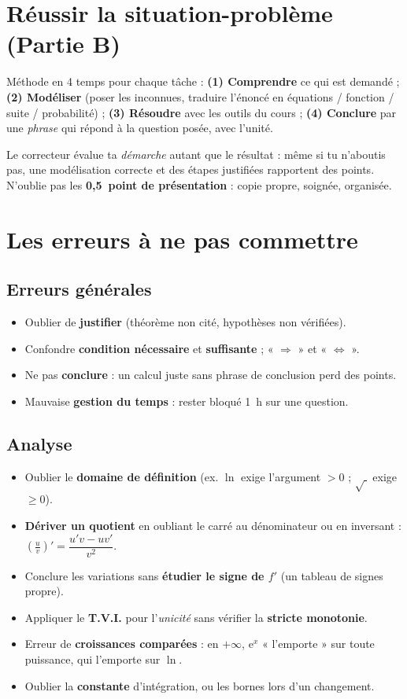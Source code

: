 \section{Réussir la situation-problème (Partie B)}

\begin{aretenir}
Méthode en 4 temps pour chaque tâche : \textbf{(1) Comprendre} ce qui est demandé ;
\textbf{(2) Modéliser} (poser les inconnues, traduire l'énoncé en équations / fonction /
suite / probabilité) ; \textbf{(3) Résoudre} avec les outils du cours ; \textbf{(4) Conclure}
par une \emph{phrase} qui répond à la question posée, avec l'unité.
\end{aretenir}

\noindent Le correcteur évalue ta \emph{démarche} autant que le résultat : même si tu
n'aboutis pas, une modélisation correcte et des étapes justifiées rapportent des points.
N'oublie pas les \textbf{0,5~point de présentation} : copie propre, soignée, organisée.

\section{Les erreurs à ne pas commettre}

\subsection{Erreurs générales}
\begin{itemize}
\item Oublier de \textbf{justifier} (théorème non cité, hypothèses non vérifiées).
\item Confondre \textbf{condition nécessaire} et \textbf{suffisante} ; « $\Rightarrow$ » et « $\iff$ ».
\item Ne pas \textbf{conclure} : un calcul juste sans phrase de conclusion perd des points.
\item Mauvaise \textbf{gestion du temps} : rester bloqué 1~h sur une question.
\end{itemize}

\subsection{Analyse}
\begin{itemize}
\item Oublier le \textbf{domaine de définition} (ex. $\ln$ exige l'argument $>0$ ; $\sqrt{\ }$ exige $\ge0$).
\item \textbf{Dériver un quotient} en oubliant le carré au dénominateur ou en inversant : $\left(\frac uv\right)'=\dfrac{u'v-uv'}{v^2}$.
\item Conclure les variations sans \textbf{étudier le signe de $f'$} (un tableau de signes propre).
\item Appliquer le \textbf{T.V.I.} pour l'\emph{unicité} sans vérifier la \textbf{stricte monotonie}.
\item Erreur de \textbf{croissances comparées} : en $+\infty$, $\mathrm{e}^x$ « l'emporte » sur toute puissance, qui l'emporte sur $\ln$.
\item Oublier la \textbf{constante} d'intégration, ou les bornes lors d'un changement.
\end{itemize}


